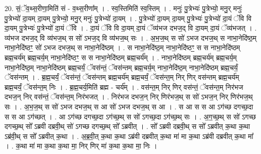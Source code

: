 \documentclass[17pt]{extarticle}
\begin{document}
20. सं॒ॅव॒थ्स॒रीणा॒मिति॑ सं - व॒थ्स॒रीणा᳚म् । . स्व॒स्तिमिति॑ स्व॒स्तिम् । . मनुः॑ पु॒त्रेभ्यः॑ पु॒त्रेभ्यो॒ मनु॒र् मनुः॑ पु॒त्रेभ्यो॑ दा॒यम् दा॒यम् पु॒त्रेभ्यो॒ मनु॒र् मनुः॑ पु॒त्रेभ्यो॑ दा॒यम् । . पु॒त्रेभ्यो॑ दा॒यम् दा॒यम् पु॒त्रेभ्यः॑ पु॒त्रेभ्यो॑ दा॒यं ॅवि वि दा॒यम् पु॒त्रेभ्यः॑ पु॒त्रेभ्यो॑ दा॒यं ॅवि । . दा॒यं ॅवि वि दा॒यम् दा॒यं ॅव्य॑भज दभज॒द् वि दा॒यम् दा॒यं ॅव्य॑भजत् । . व्य॑भज दभज॒द् वि व्य॑भज॒थ् स सो॑ ऽभज॒द् वि व्य॑भज॒थ् सः । . अ॒भ॒ज॒थ् स सो॑ ऽभज दभज॒थ् स नाभा॒नेदि॑ष्ठ॒म् नाभा॒नेदि॑ष्ठꣳ॒॒ सो॑ ऽभज दभज॒थ् स नाभा॒नेदि॑ष्ठम् । . स नाभा॒नेदि॑ष्ठ॒म् नाभा॒नेदि॑ष्ठꣳ॒॒ स स नाभा॒नेदि॑ष्ठम् ब्रह्म॒चर्य॑म् ब्रह्म॒चर्य॒म् नाभा॒नेदि॑ष्ठꣳ॒॒ स स नाभा॒नेदि॑ष्ठम् ब्रह्म॒चर्य᳚म् । . नाभा॒नेदि॑ष्ठम् ब्रह्म॒चर्य॑म् ब्रह्म॒चर्य॒म् नाभा॒नेदि॑ष्ठ॒म् नाभा॒नेदि॑ष्ठम् ब्रह्म॒चर्यं॒ ॅवस॑न्तं॒ ॅवस॑न्तम् ब्रह्म॒चर्य॒म् नाभा॒नेदि॑ष्ठ॒म् नाभा॒नेदि॑ष्ठम् ब्रह्म॒चर्यं॒ ॅवस॑न्तम् । . ब्र॒ह्म॒चर्यं॒ ॅवस॑न्तं॒ ॅवस॑न्तम् ब्रह्म॒चर्य॑म् ब्रह्म॒चर्यं॒ ॅवस॑न्त॒म् निर् णिर् वस॑न्तम् ब्रह्म॒चर्य॑म् ब्रह्म॒चर्यं॒ ॅवस॑न्त॒म् निः । . ब्र॒ह्म॒चर्य॒मिति॑ ब्रह्म - चर्य᳚म् । . वस॑न्त॒म् निर् णिर् वस॑न्तं॒ ॅवस॑न्त॒म् निर॑भज दभज॒न् निर् वस॑न्तं॒ ॅवस॑न्त॒म् निर॑भजत् । . निर॑भज दभज॒न् निर् णिर॑भज॒थ् स सो॑ ऽभज॒न् निर् णिर॑भज॒थ् सः । . अ॒भ॒ज॒थ् स सो॑ ऽभज दभज॒थ् स आ सो॑ ऽभज दभज॒थ् स आ । . स आ स स आ ऽग॑च्छ दगच्छ॒दा स स आ ऽग॑च्छत् । . आ ऽग॑च्छ दगच्छ॒दा ऽग॑च्छ॒थ् स सो॑ ऽगच्छ॒दा ऽग॑च्छ॒थ् सः । . अ॒ग॒च्छ॒थ् स सो॑ ऽगच्छ दगच्छ॒थ् सो᳚ ऽब्रवी दब्रवी॒थ् सो॑ ऽगच्छ दगच्छ॒थ् सो᳚ ऽब्रवीत् । . सो᳚ ऽब्रवी दब्रवी॒थ् स सो᳚ ऽब्रवीत् क॒था क॒था ऽब्र॑वी॒थ् स सो᳚ ऽब्रवीत् क॒था । . अ॒ब्र॒वी॒त् क॒था क॒था ऽब्र॑वी दब्रवीत् क॒था मा॑ मा क॒था ऽब्र॑वी दब्रवीत् क॒था मा᳚ । . क॒था मा॑ मा क॒था क॒था मा॒ निर् णिर् मा॑ क॒था क॒था मा॒ निः । \newline
\end{document}

